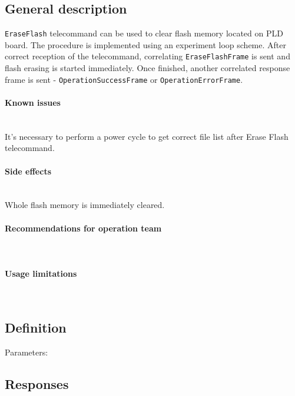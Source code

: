 

\subsection{General description}
\texttt{EraseFlash} telecommand can be used to clear \obc flash memory located on PLD board. The procedure is implemented using an experiment loop scheme. After correct reception of the telecommand, correlating \texttt{EraseFlashFrame} is sent and flash erasing is started immediately. Once finished, another correlated response frame is sent - \texttt{OperationSuccessFrame} or \texttt{OperationErrorFrame}.

\paragraph{Known issues} \mbox{} \\
It's necessary to perform a power cycle to get correct file list after Erase Flash telecommand.

\paragraph{Side effects} \mbox{} \\
Whole flash memory is immediately cleared.

\paragraph{Recommendations for operation team} \mbox{} \\
\None

\paragraph{Usage limitations} \mbox{} \\ 
\None

\subsection{Definition}

Parameters: 

\begin{tcarglist}
\end{tcarglist}

\subsection{Responses}
